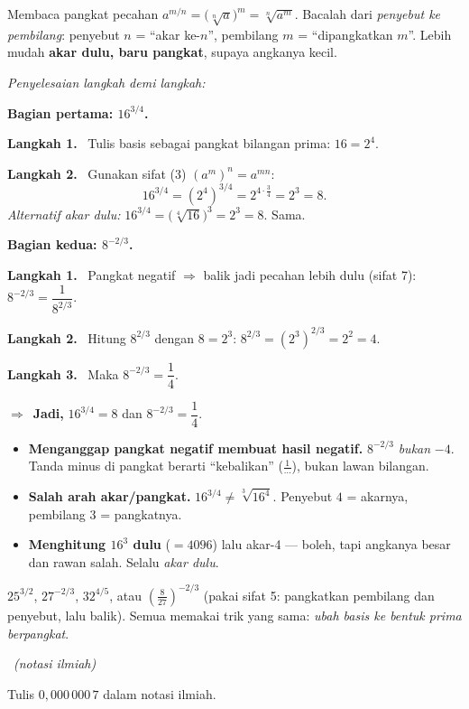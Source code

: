 \documentclass[11pt,a4paper]{report}
\theoremstyle{gaya}
\newcommand{\jawab}{\par\smallskip\noindent\textit{\textcolor{oranye}{Penyelesaian langkah demi langkah:}}\par\smallskip}
\newcommand{\langkah}[1]{\par\smallskip\noindent\textbf{\textcolor{biru}{Langkah #1.}}\ }
\newcommand{\jadi}{\par\smallskip\noindent$\Rightarrow$\ \textbf{Jadi, }}
\newcommand{\soalno}[2]{%
  \par\bigskip
  \noindent{\large\bfseries\color{ungu}\rule[-2pt]{4pt}{14pt}\ Soal #1}%
  \ {\normalfont\itshape\color{gray}(#2)}\par\nopagebreak\smallskip}
\begin{document}
\begin{ingat}{Membaca pangkat pecahan}
$a^{m/n} = \big(\sqrt[n]{a}\big)^m = \sqrt[n]{a^m}$. Bacalah dari
\emph{penyebut ke pembilang}: penyebut $n$ = ``akar ke-$n$'', pembilang $m$ =
``dipangkatkan $m$''. Lebih mudah \textbf{akar dulu, baru pangkat}, supaya
angkanya kecil.
\end{ingat}

\jawab
\textbf{Bagian pertama: $16^{3/4}$.}
\langkah{1} Tulis basis sebagai pangkat bilangan prima: $16 = 2^4$.
\langkah{2} Gunakan sifat (3) $(a^m)^n=a^{mn}$:
\[
16^{3/4} = (2^4)^{3/4} = 2^{4\cdot \frac34} = 2^{3} = 8.
\]
\emph{Alternatif akar dulu:} $16^{3/4} = \big(\sqrt[4]{16}\big)^3 = 2^3 = 8$. Sama.

\textbf{Bagian kedua: $8^{-2/3}$.}
\langkah{1} Pangkat negatif $\Rightarrow$ balik jadi pecahan lebih dulu (sifat 7):
$8^{-2/3} = \dfrac{1}{8^{2/3}}$.
\langkah{2} Hitung $8^{2/3}$ dengan $8=2^3$: $8^{2/3}=(2^3)^{2/3}=2^2=4$.
\langkah{3} Maka $8^{-2/3} = \dfrac{1}{4}$.
\jadi $16^{3/4}=8$ dan $8^{-2/3}=\dfrac14$.

\begin{jebakan}
\begin{itemize}[leftmargin=*,topsep=2pt]
  \item \textbf{Menganggap pangkat negatif membuat hasil negatif.}
  $8^{-2/3}$ \emph{bukan} $-4$. Tanda minus di pangkat berarti ``kebalikan''
  ($\frac1{\cdots}$), bukan lawan bilangan.
  \item \textbf{Salah arah akar/pangkat.} $16^{3/4}\neq \sqrt[3]{16^4}$.
  Penyebut $4$ = akarnya, pembilang $3$ = pangkatnya.
  \item \textbf{Menghitung $16^3$ dulu} ($=4096$) lalu akar-4 --- boleh, tapi
  angkanya besar dan rawan salah. Selalu \emph{akar dulu}.
\end{itemize}
\end{jebakan}

\begin{variasi}
$25^{3/2}$, $27^{-2/3}$, $32^{4/5}$, atau $\left(\tfrac{8}{27}\right)^{-2/3}$
(pakai sifat 5: pangkatkan pembilang dan penyebut, lalu balik). Semua memakai
trik yang sama: \emph{ubah basis ke bentuk prima berpangkat}.
\end{variasi}

\soalno{1.1.3}{notasi ilmiah}
\begin{soalbox}{}
Tulis $0{,}000\,000\,7$ dalam notasi ilmiah.
\end{soalbox}
\end{document}
